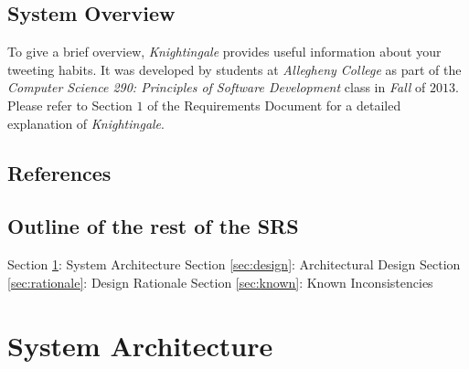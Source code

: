 \documentclass[a4paper, 12pt]{article}
\begin{document}
\subsection{System Overview} \label{sec:view}
\begin{adjustwidth}{2em}{0pt}
To give a brief overview, \textit{Knightingale} provides useful information about your tweeting habits. It was developed by students at \textit{Allegheny College} as part of the \textit{Computer Science 290: Principles of Software Development} class in \textit{Fall} of $2013$. Please refer to Section $1$ of the Requirements Document for a detailed explanation of \textit{Knightingale}. \newline
\end{adjustwidth}

\subsection{References} \label{sec:ref}
\begin{adjustwidth}{2em}{0pt}

\end{adjustwidth}

\subsection{Outline of the rest of the SRS} \label{sec:outline}
\begin{adjustwidth}{2em}{0pt}
Section \ref{sec:arch}: System Architecture \newline
Section \ref{sec:design}: Architectural Design \newline
Section \ref{sec:rationale}: Design Rationale \newline
Section \ref{sec:known}: Known Inconsistencies \newline
\end{adjustwidth}

\section{System Architecture} \label{sec:arch}
\end{document}
